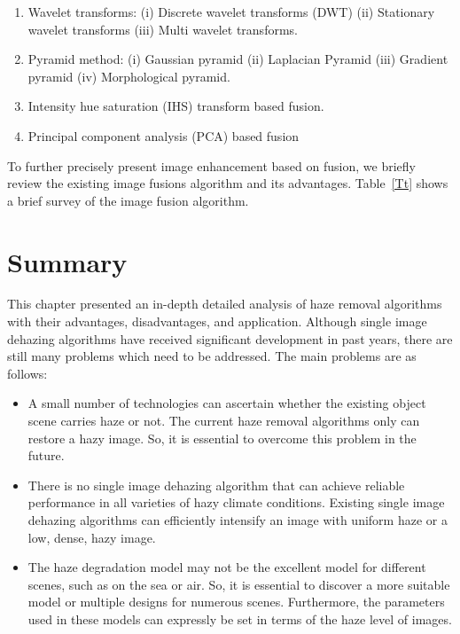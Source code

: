 \documentclass[doctor,english,listoffigures,listoftables]{thesis-uestc}
\begin{document}
\begin{enumerate}
\item  Wavelet transforms: (i) Discrete wavelet transforms (DWT) (ii) Stationary wavelet transforms (iii) Multi wavelet transforms. 
\item Pyramid method: (i) Gaussian pyramid (ii) Laplacian Pyramid (iii) Gradient pyramid (iv) Morphological pyramid.
\item Intensity hue saturation (IHS) transform based fusion.
\item  Principal component analysis (PCA) based fusion
\end{enumerate}
To further precisely present image enhancement based on fusion, we briefly review the existing image fusions algorithm and its advantages. Table~\ref{Tt} shows a brief survey of the image fusion algorithm. 
 \section{Summary}
 This chapter presented an in-depth detailed analysis of haze removal algorithms with their advantages, disadvantages, and application. Although single image dehazing algorithms have received significant development in past years, there are still many problems which need to be addressed. The main problems are as follows:
\begin{itemize} 
            \item A small number of technologies can ascertain whether the existing object scene carries haze or not. The current haze removal algorithms only can restore a hazy image. So, it is essential to overcome this problem in the future.
            \item There is no single image dehazing algorithm that can achieve reliable performance in all varieties of hazy climate conditions. Existing single image dehazing algorithms can efficiently intensify an image with uniform haze or a low, dense, hazy image.
            \item The haze degradation model may not be the excellent model for different scenes, such as on the sea or air. So, it is essential to discover a more suitable model or multiple designs for numerous scenes. Furthermore, the parameters used in these models can expressly be set in terms of the haze level of images.
        \end{itemize}
\end{document}

